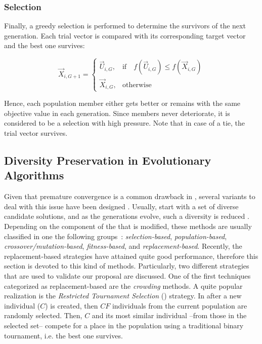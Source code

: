 \subsubsection{Selection}
Finally, a greedy selection is performed to determine the survivors of the next generation.
%
Each trial vector is compared with its corresponding target vector and the best one survives:

\begin{equation} \label{eqn:selection}
\vec{X}_{i,G+1}= 
\begin{cases}
    \vec{U}_{i,G},& \text{if} \quad f(\vec{U}_{i,G}) \leq f(\vec{X}_{i,G})  \\
    \vec{X}_{i,G},              & \text{otherwise}
\end{cases}
\end{equation}

Hence, each population member either gets better or remains with the same objective value in each generation.
%
Since members never deteriorate, it is considered to be a selection with high pressure.
%
Note that in case of a tie, the trial vector survives.

%



\subsection{Diversity Preservation in Evolutionary Algorithms}

Given that premature convergence is a common drawback in  \EAS{}, several variants to deal with this issue have been designed \cite{eshelman1993real}.
%
Usually, \EAS{} start with a set of diverse candidate solutions, and as the generations evolve, such a diversity 
is reduced \cite{Crepinsek:13}.
%
Depending on the component of the \EA{} that is modified, these methods are usually classified in one the following groups~\cite{Crepinsek:13}: \textit{selection-based}, \textit{population-based}, \textit{crossover/mutation-based}, \textit{fitness-based}, and \textit{replacement-based}.
%
Recently, the replacement-based strategies have attained quite good performance, therefore this section is devoted to this kind
of methods.
%
Particularly, two different strategies that are used to validate our proposal are discussed.
%
One of the first techniques categorized as replacement-based are the \textit{crowding} methods.
%
A quite popular realization is the \textit{Restricted Tournament Selection} \cite{harik1995finding} (\RTS{}) strategy.
%
In \RTS{} after a new individual ($C$) is created, then $CF$ individuals from the current population are randomly selected.
%
Then, $C$ and its most similar individual --from those in the selected set-- compete for a place in the population using a traditional binary tournament, i.e. the best one survives.
%

